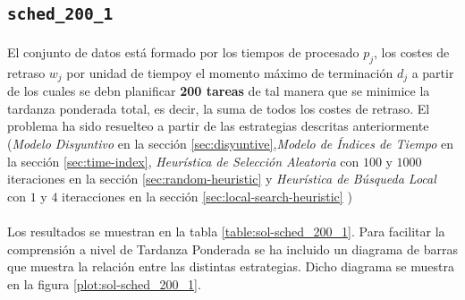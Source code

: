 \documentclass[spanish]{article}
\begin{document}
		\subsection{\texttt{sched\_200\_1}}

			\paragraph{}
			El conjunto de datos está formado por los tiempos de procesado $p_j$, los costes de retraso $w_j$ por unidad de tiempoy el momento máximo de terminación $d_j$ a partir de los cuales se debn planificar \textbf{200 tareas} de tal manera que se minimice la tardanza ponderada total, es decir, la suma de todos los costes de retraso. El problema ha sido resuelteo a partir de las estrategias descritas anteriormente (\emph{Modelo Disyuntivo} en la sección \ref{sec:disyuntive},\emph{Modelo de Índices de Tiempo} en la sección \ref{sec:time-index}, \emph{Heurística de Selección Aleatoria} con $100$ y $1000$ iteraciones en la sección \ref{sec:random-heuristic} y \emph{Heurística de Búsqueda Local} con $1$ y $4$ iteracciones en la sección \ref{sec:local-search-heuristic} )



			\paragraph{}
			Los resultados se muestran en la tabla \ref{table:sol-sched_200_1}. Para facilitar la comprensión a nivel de Tardanza Ponderada se ha incluido un diagrama de barras que muestra la relación entre las distintas estrategias. Dicho diagrama se muestra en la figura \ref{plot:sol-sched_200_1}.
\end{document}
